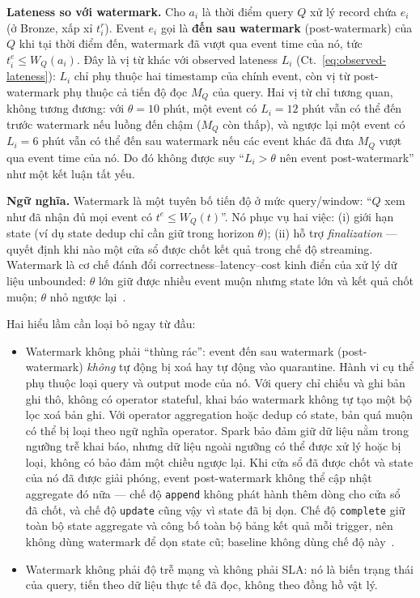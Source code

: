 \textbf{Lateness so với watermark.} Cho $a_i$ là thời điểm query $Q$ xử lý
record chứa $e_i$ (ở Bronze, xấp xỉ $t^{r}_i$). Event $e_i$ gọi là
\textbf{đến sau watermark} (post-watermark) của $Q$ khi tại thời điểm đến,
watermark đã vượt qua event time của nó, tức $t^{e}_i \leq W_Q(a_i)$.
Đây là vị từ khác với observed lateness $L_i$
(Ct.~\ref{eq:observed-lateness}): $L_i$ chỉ phụ thuộc hai timestamp của
chính event, còn vị từ post-watermark phụ thuộc cả tiến độ đọc $M_Q$ của
query. Hai vị từ chỉ tương quan, không tương đương: với $\theta = 10$ phút,
một event có $L_i = 12$ phút vẫn có thể đến trước watermark nếu luồng đến
chậm ($M_Q$ còn thấp), và ngược lại một event có $L_i = 6$ phút vẫn có thể
đến sau watermark nếu các event khác đã đưa $M_Q$ vượt qua event time của
nó. Do đó không được suy ``$L_i > \theta$ nên event post-watermark'' như
một kết luận tất yếu.

\textbf{Ngữ nghĩa.} Watermark là một tuyên bố tiến độ ở mức query/window: ``$Q$
xem như đã nhận đủ mọi event có $t^{e} \leq W_Q(t)$''. Nó phục vụ hai việc:
(i) giới hạn state (ví dụ state dedup chỉ cần giữ trong horizon $\theta$);
(ii) hỗ trợ \textit{finalization} --- quyết định khi nào một cửa sổ được chốt
kết quả trong chế độ streaming. Watermark là cơ chế đánh đổi
correctness--latency--cost kinh điển của xử lý dữ liệu unbounded: $\theta$ lớn
giữ được nhiều event muộn nhưng state lớn và kết quả chốt muộn; $\theta$ nhỏ
ngược lại~\cite{dataflow_model_2015}.

Hai hiểu lầm cần loại bỏ ngay từ đầu:
\begin{itemize}
  \item Watermark không phải ``thùng rác'': event đến sau watermark
        (post-watermark) \emph{không} tự động bị xoá hay tự động vào
        quarantine. Hành vi cụ thể phụ thuộc loại query và output mode của
        nó. Với query chỉ chiếu và ghi bản ghi thô, không có operator
        stateful, khai báo watermark không tự tạo một bộ lọc xoá bản ghi.
        Với operator aggregation hoặc dedup có state, bản quá muộn có
        thể bị loại theo ngữ nghĩa operator. Spark bảo đảm giữ dữ liệu
        nằm trong ngưỡng trễ khai báo, nhưng dữ liệu ngoài ngưỡng có thể
        được xử lý hoặc bị loại, không có bảo đảm một chiều ngược lại.
        Khi cửa
        sổ đã được chốt và state của nó đã được giải phóng, event
        post-watermark không thể cập nhật aggregate đó nữa --- chế độ
        \texttt{append} không phát hành thêm dòng cho cửa sổ đã chốt, và
        chế độ \texttt{update} cũng vậy vì state đã bị dọn. Chế độ
        \texttt{complete} giữ toàn bộ state aggregate và công bố toàn bộ
        bảng kết quả mỗi trigger, nên không dùng watermark để dọn state
        cũ; baseline không dùng chế độ này~\cite{spark_docs_4_2}.
  \item Watermark không phải độ trễ mạng và không phải SLA: nó là biến trạng
        thái của query, tiến theo dữ liệu thực tế đã đọc, không theo đồng hồ
        vật lý.
\end{itemize}

